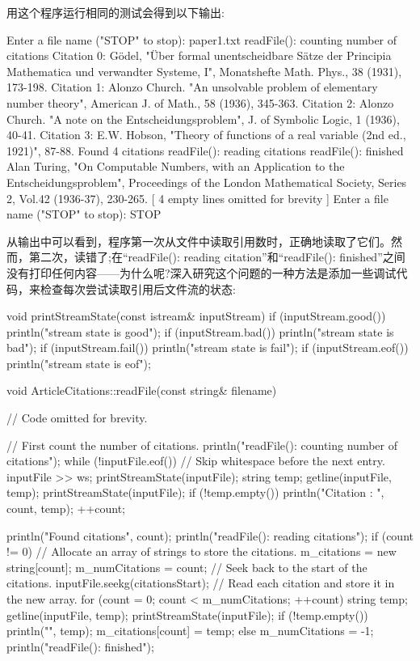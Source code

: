 用这个程序运行相同的测试会得到以下输出:

\begin{shell}
Enter a file name ("STOP" to stop): paper1.txt
readFile(): counting number of citations
Citation 0: Gödel, "Über formal unentscheidbare Sätze der Principia Mathematica und
verwandter Systeme, I", Monatshefte Math. Phys., 38 (1931), 173-198.
Citation 1: Alonzo Church. "An unsolvable problem of elementary number theory",
American J. of Math., 58 (1936), 345-363.
Citation 2: Alonzo Church. "A note on the Entscheidungsproblem", J. of Symbolic
Logic, 1 (1936), 40-41.
Citation 3: E.W. Hobson, "Theory of functions of a real variable (2nd ed.,
1921)", 87-88.
Found 4 citations
readFile(): reading citations
readFile(): finished
Alan Turing, "On Computable Numbers, with an Application to the
Entscheidungsproblem", Proceedings of the London Mathematical Society, Series 2,
Vol.42 (1936-37), 230-265.
[ 4 empty lines omitted for brevity ]
Enter a file name ("STOP" to stop): STOP
\end{shell}

从输出中可以看到，程序第一次从文件中读取引用数时，正确地读取了它们。然而，第二次，读错了;在“readFile(): reading citation”和“readFile(): finished”之间没有打印任何内容——为什么呢?深入研究这个问题的一种方法是添加一些调试代码，来检查每次尝试读取引用后文件流的状态:

\begin{cpp}
void printStreamState(const istream& inputStream)
{
    if (inputStream.good()) { println("stream state is good"); }
    if (inputStream.bad()) { println("stream state is bad"); }
    if (inputStream.fail()) { println("stream state is fail"); }
    if (inputStream.eof()) { println("stream state is eof"); }
}

void ArticleCitations::readFile(const string& filename)
{
    // Code omitted for brevity.

    // First count the number of citations.
    println("readFile(): counting number of citations");
    while (!inputFile.eof()) {
        // Skip whitespace before the next entry.
        inputFile >> ws;
        printStreamState(inputFile);
        string temp;
        getline(inputFile, temp);
        printStreamState(inputFile);
        if (!temp.empty()) {
            println("Citation {}: {}", count, temp);
            ++count;
        }
    }

    println("Found {} citations", count);
    println("readFile(): reading citations");
    if (count != 0) {
        // Allocate an array of strings to store the citations.
        m_citations = new string[count];
        m_numCitations = count;
        // Seek back to the start of the citations.
        inputFile.seekg(citationsStart);
        // Read each citation and store it in the new array.
        for (count = 0; count < m_numCitations; ++count) {
            string temp;
            getline(inputFile, temp);
            printStreamState(inputFile);
            if (!temp.empty()) {
                println("{}", temp);
                m_citations[count] = temp;
            }
        }
    } else {
        m_numCitations = -1;
    }
    println("readFile(): finished");
}
\end{cpp}

